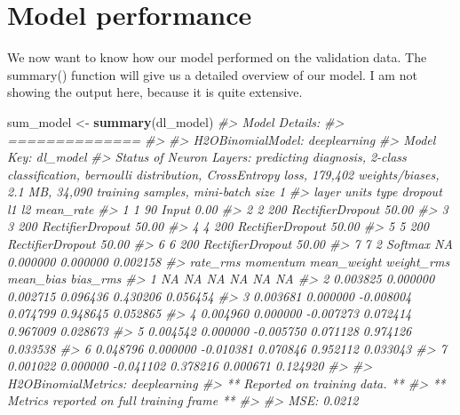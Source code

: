 \documentclass[]{book}
\newenvironment{Shaded}{\begin{snugshade}}{\end{snugshade}}
\newcommand{\CommentTok}[1]{\textcolor[rgb]{0.56,0.35,0.01}{\textit{#1}}}
\newcommand{\KeywordTok}[1]{\textcolor[rgb]{0.13,0.29,0.53}{\textbf{#1}}}
\newcommand{\NormalTok}[1]{#1}
\newcommand{\StringTok}[1]{\textcolor[rgb]{0.31,0.60,0.02}{#1}}
\begin{document}
\hypertarget{model-performance}{%
\section{Model performance}\label{model-performance}}

We now want to know how our model performed on the validation data. The summary() function will give us a detailed overview of our model. I am not showing the output here, because it is quite extensive.

\begin{Shaded}
\begin{Highlighting}[]
\NormalTok{sum_model <-}\StringTok{ }\KeywordTok{summary}\NormalTok{(dl_model)}
\CommentTok{#> Model Details:}
\CommentTok{#> ==============}
\CommentTok{#> }
\CommentTok{#> H2OBinomialModel: deeplearning}
\CommentTok{#> Model Key:  dl_model }
\CommentTok{#> Status of Neuron Layers: predicting diagnosis, 2-class classification, bernoulli distribution, CrossEntropy loss, 179,402 weights/biases, 2.1 MB, 34,090 training samples, mini-batch size 1}
\CommentTok{#>   layer units             type dropout       l1       l2 mean_rate}
\CommentTok{#> 1     1    90            Input  0.00 %       NA       NA        NA}
\CommentTok{#> 2     2   200 RectifierDropout 50.00 % 0.000000 0.000000  0.004555}
\CommentTok{#> 3     3   200 RectifierDropout 50.00 % 0.000000 0.000000  0.006484}
\CommentTok{#> 4     4   200 RectifierDropout 50.00 % 0.000000 0.000000  0.009338}
\CommentTok{#> 5     5   200 RectifierDropout 50.00 % 0.000000 0.000000  0.008749}
\CommentTok{#> 6     6   200 RectifierDropout 50.00 % 0.000000 0.000000  0.020938}
\CommentTok{#> 7     7     2          Softmax      NA 0.000000 0.000000  0.002158}
\CommentTok{#>   rate_rms momentum mean_weight weight_rms mean_bias bias_rms}
\CommentTok{#> 1       NA       NA          NA         NA        NA       NA}
\CommentTok{#> 2 0.003825 0.000000    0.002715   0.096436  0.430206 0.056454}
\CommentTok{#> 3 0.003681 0.000000   -0.008004   0.074799  0.948645 0.052865}
\CommentTok{#> 4 0.004960 0.000000   -0.007273   0.072414  0.967009 0.028673}
\CommentTok{#> 5 0.004542 0.000000   -0.005750   0.071128  0.974126 0.033538}
\CommentTok{#> 6 0.048796 0.000000   -0.010381   0.070846  0.952112 0.033043}
\CommentTok{#> 7 0.001022 0.000000   -0.041102   0.378216  0.000671 0.124920}
\CommentTok{#> }
\CommentTok{#> H2OBinomialMetrics: deeplearning}
\CommentTok{#> ** Reported on training data. **}
\CommentTok{#> ** Metrics reported on full training frame **}
\CommentTok{#> }
\CommentTok{#> MSE:  0.0212}
}}}}}}
\end{Highlighting}
\end{Shaded}
\end{document}

